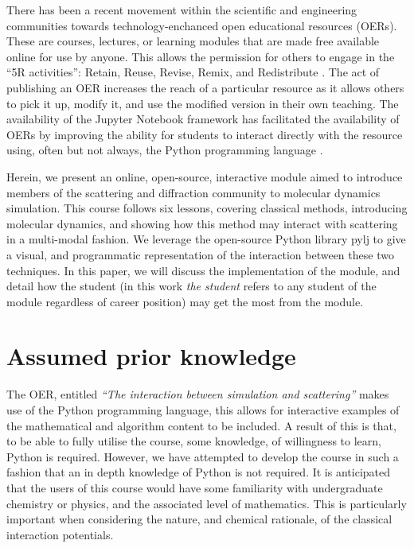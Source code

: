 \documentclass[amsmath,amssymb,twocolumn,superscriptaddress]{revtex4-1}
\begin{document}
There has been a recent movement within the scientific and engineering communities towards technology-enchanced open educational resources (OERs).
These are courses, lectures, or learning modules that are made free available online for use by anyone.
This allows the permission for others to engage in the ``5R activities'': Retain, Reuse, Revise, Remix, and Redistribute \cite{opencontent2018}.
The act of publishing an OER increases the reach of a particular resource as it allows others to pick it up, modify it, and use the modified version in their own teaching.
The availability of the Jupyter Notebook framework \cite{Kluyver2016} has facilitated the availability of OERs by improving the ability for students to interact directly with the resource using, often but not always, the Python programming language \cite{Barba2017}.

Herein, we present an online, open-source, interactive module aimed to introduce members of the scattering and diffraction community to molecular dynamics simulation.
This course follows six lessons, covering classical methods, introducing molecular dynamics, and showing how this method may interact with scattering in a multi-modal fashion.
We leverage the open-source Python library pylj \cite{McCluskey2018} to give a visual, and programmatic representation of the interaction between these two techniques.
In this paper, we will discuss the implementation of the module, and detail how the student (in this work \emph{the student} refers to any student of the module regardless of career position) may get the most from the module.

\section{Assumed prior knowledge}

The OER, entitled \emph{``The interaction between simulation and scattering''} makes use of the Python programming language, this allows for interactive examples of the mathematical and algorithm content to be included.
A result of this is that, to be able to fully utilise the course, some knowledge, of willingness to learn, Python is required.
However, we have attempted to develop the course in such a fashion that an in depth knowledge of Python is not required.
It is anticipated that the users of this course would have some familiarity with undergraduate chemistry or physics, and the associated level of mathematics.
This is particularly important when considering the nature, and chemical rationale, of the classical interaction potentials.
\end{document}
